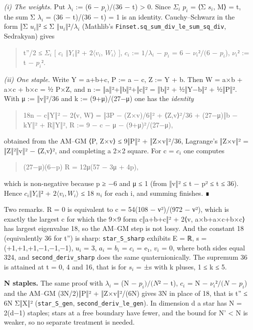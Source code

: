 \documentclass[11pt,a4paper]{article}
\theoremstyle{named}
\begin{document}
\textit{(i) The weights.} Put $λ_i$ := (6 − $p_i)/(36$ − t) \textgreater{} 0. Since $Σ_i$ $p_i$ = ⟨Σ $s_i$, M⟩ = t, the sum Σ $λ_i$ = (36 − t)/(36 − t) = 1 is an identity. Cauchy–Schwarz in the form ‖Σ $u_i‖²$ ≤ Σ $‖u_i‖²/λ_i$ (Mathlib's \texttt{Finset.\allowbreak{}sq\_\allowbreak{}sum\_\allowbreak{}div\_\allowbreak{}le\_\allowbreak{}sum\_\allowbreak{}sq\_\allowbreak{}div}, Sedrakyan) gives

\begin{quote}
t''/2 ≤ $Σ_i$ [ $c_i$ $‖Y_i‖²$ + $2⟨v_i$, $W_i⟩$ ],  $c_i$ := $1/λ_i$ − $p_i$ = 6 − $ν_i²/(6$ − $p_i$),  $ν_i²$ := t − $p_i²$.
\end{quote}
\textit{(ii) One staple.} Write Y = a+b+c, P := a − c, Z := Y + b. Then W = a×b + a×c + b×c = ½ P×Z, and n := ‖a‖²+‖b‖²+‖c‖² = ‖b‖² + ½‖Y−b‖² + ½‖P‖². With μ := ‖v‖²/36 and k := (9+μ)/(27−μ) one has the \textit{identity}

\begin{quote}
18n − c‖Y‖² − 2⟨v, W⟩ = ‖3P − (Z×v)/6‖² + ⟨Z,v⟩²/36 + (27−μ)‖b − kY‖² + R‖Y‖², R := 9 − c − μ − (9+μ)²/(27−μ),
\end{quote}
obtained from the AM–GM ⟨P, Z×v⟩ ≤ 9‖P‖² + ‖Z×v‖²/36, Lagrange's ‖Z×v‖² = ‖Z‖²‖v‖² − ⟨Z,v⟩², and completing a 2×2 square. For c = $c_i$ one computes

\begin{quote}
(27−μ)(6−p) R = 12μ(57 − 3μ + 4p),
\end{quote}
which is non-negative because p ≥ −6 and μ ≤ 1 (from ‖v‖² ≤ t − p² ≤ t ≤ 36). Hence $c_i‖Y_i‖²$ + $2⟨v_i,W_i⟩$ ≤ 18 $n_i$ for each i, and summing finishes. ∎

Two remarks. R = 0 is equivalent to c = 54(108 − ν²)/(972 − ν²), which is exactly the largest c for which the 9×9 form c‖a+b+c‖² + 2⟨v, a×b+a×c+b×c⟩ has largest eigenvalue 18, so the AM–GM step is not lossy. And the constant 18 (equivalently 36 for t'') is sharp: \texttt{star\_\allowbreak{}S\_\allowbreak{}sharp} exhibits E = ℝ, s = (+1,+1,+1,−1,−1,−1), $u_i$ = 3, $a_i$ = $b_i$ = $c_i$ = e₁, $v_i$ = 0, where both sides equal 324, and \texttt{second\_\allowbreak{}deriv\_\allowbreak{}sharp} does the same quaternionically. The supremum 36 is attained at t = 0, 4 and 16, that is for $s_i$ = ±s with k pluses, 1 ≤ k ≤ 5.

\textbf{N staples.} The same proof with $λ_i$ = (N − $p_i)/(N²$ − t), $c_i$ = N − $ν_i²/(N$ − $p_i$) and the AM–GM (3N/2)‖P‖² + ‖Z×v‖²/(6N) gives 3N in place of 18, that is t'' ≤ 6N Σ‖X‖² (\texttt{star\_\allowbreak{}S\_\allowbreak{}gen}, \texttt{second\_\allowbreak{}deriv\_\allowbreak{}le\_\allowbreak{}gen}). In dimension d a star has N = 2(d−1) staples; stars at a free boundary have fewer, and the bound for N' \textless{} N is weaker, so no separate treatment is needed.
\end{document}
